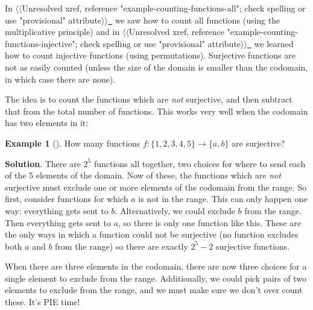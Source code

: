 \documentclass[10pt,]{book}
\theoremstyle{plain}
\theoremstyle{definition}
\theoremstyle{definition}
\newtheorem{example}[theorem]{Example}
\theoremstyle{definition}
\theoremstyle{definition}
\numberwithin{equation}{chapter}
\begin{document}
\hypertarget{p-887}{}%
In {$\langle\langle$Unresolved xref, reference "example-counting-functions-all"; check spelling or use "provisional" attribute$\rangle\rangle$}\hyperlink{}{~} we saw how to count all functions (using the multiplicative principle) and in {$\langle\langle$Unresolved xref, reference "example-counting-functions-injective"; check spelling or use "provisional" attribute$\rangle\rangle$}\hyperlink{}{~} we learned how to count injective functions (using permutations).  Surjective functions are not as easily counted (unless the size of the domain is smaller than the codomain, in which case there are none).%
\par
\hypertarget{p-888}{}%
The idea is to count the functions which are \emph{not} surjective, and then subtract that from the total number of functions. This works very well when the codomain has two elements in it:%
\begin{example}[]\label{example-17}
\hypertarget{p-889}{}%
How many functions \(f: \{1,2,3,4,5\} \to \{a,b\}\) are surjective?%
\par\smallskip%
\noindent\textbf{Solution}.\hypertarget{solution-82}{}\quad%
\hypertarget{p-890}{}%
There are \(2^5\) functions all together, two choices for where to send each of the 5 elements of the domain. Now of these, the functions which are \emph{not} surjective must exclude one or more elements of the codomain from the range. So first, consider functions for which \(a\) is not in the range. This can only happen one way: everything gets sent to \(b\). Alternatively, we could exclude \(b\) from the range. Then everything gets sent to \(a\), so there is only one function like this. These are the only ways in which a function could not be surjective (no function excludes both \(a\) and \(b\) from the range) so there are exactly \(2^5 - 2\) surjective functions.%
\end{example}
\hypertarget{p-891}{}%
When there are three elements in the codomain, there are now three choices for a single element to exclude from the range. Additionally, we could pick pairs of two elements to exclude from the range, and we must make sure we don't over count these. It's PIE time!%
\end{document}

